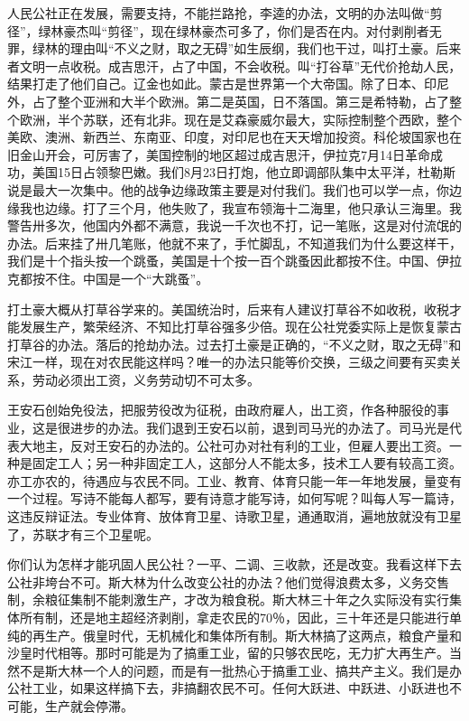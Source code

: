 人民公社正在发展，需要支持，不能拦路抢，李逵的办法，文明的办法叫做“剪径”，绿林豪杰叫“剪径”，现在绿林豪杰可多了，你们是否在内。对付剥削者无罪，绿林的理由叫“不义之财，取之无碍”如生辰纲，我们也干过，叫打土豪。后来者文明一点收税。成吉思汗，占了中国，不会收税。叫“打谷草”无代价抢劫人民，结果打走了他们自己。辽金也如此。蒙古是世界第一个大帝国。除了日本、印尼外，占了整个亚洲和大半个欧洲。第二是英国，日不落国。第三是希特勒，占了整个欧洲，半个苏联，还有北非。现在是艾森豪威尔最大，实际控制整个西欧，整个美欧、澳洲、新西兰、东南亚、印度，对印尼也在天天增加投资。科伦坡国家也在旧金山开会，可厉害了，美国控制的地区超过成吉思汗，伊拉克7月14日革命成功，美国15日占领黎巴嫩。我们8月23日打炮，他立即调部队集中太平洋，杜勒斯说是最大一次集中。他的战争边缘政策主要是对付我们。我们也可以学一点，你边缘我也边缘。打了三个月，他失败了，我宣布领海十二海里，他只承认三海里。我警告卅多次，他国内外都不满意，我说一千次也不打，记一笔账，这是对付流氓的办法。后来挂了卅几笔账，他就不来了，手忙脚乱，不知道我们为什么要这样干，我们是十个指头按一个跳蚤，美国是十个按一百个跳蚤因此都按不住。中国、伊拉克都按不住。中国是一个“大跳蚤”。

打土豪大概从打草谷学来的。美国统治时，后来有人建议打草谷不如收税，收税才能发展生产，繁荣经济、不知比打草谷强多少倍。现在公社党委实际上是恢复蒙古打草谷的办法。落后的抢劫办法。过去打土豪是正确的，“不义之财，取之无碍”和宋江一样，现在对农民能这样吗？唯一的办法只能等价交换，三级之间要有买卖关系，劳动必须出工资，义务劳动切不可太多。

王安石创始免役法，把服劳役改为征税，由政府雇人，出工资，作各种服役的事业，这是很进步的办法。我们退到王安石以前，退到司马光的办法了。司马光是代表大地主，反对王安石的办法的。公社可办对社有利的工业，但雇人要出工资。一种是固定工人；另一种非固定工人，这部分人不能太多，技术工人要有较高工资。亦工亦农的，待遇应与农民不同。工业、教育、体育只能一年一年地发展，量变有一个过程。写诗不能每人都写，要有诗意才能写诗，如何写呢？叫每人写一篇诗，这违反辩证法。专业体育、放体育卫星、诗歌卫星，通通取消，遍地放就没有卫星了，苏联才有三个卫星呢。

你们认为怎样才能巩固人民公社？一平、二调、三收款，还是改变。我看这样下去公社非垮台不可。斯大林为什么改变公社的办法？他们觉得浪费太多，义务交售制，余粮征集制不能刺激生产，才改为粮食税。斯大林三十年之久实际没有实行集体所有制，还是地主超经济剥削，拿走农民的70％，因此，三十年还是只能进行单纯的再生产。俄皇时代，无机械化和集体所有制。斯大林搞了这两点，粮食产量和沙皇时代相等。那时可能是为了搞重工业，留的只够农民吃，无力扩大再生产。当然不是斯大林一个人的问题，而是有一批热心于搞重工业、搞共产主义。我们是办公社工业，如果这样搞下去，非搞翻农民不可。任何大跃进、中跃进、小跃进也不可能，生产就会停滞。

